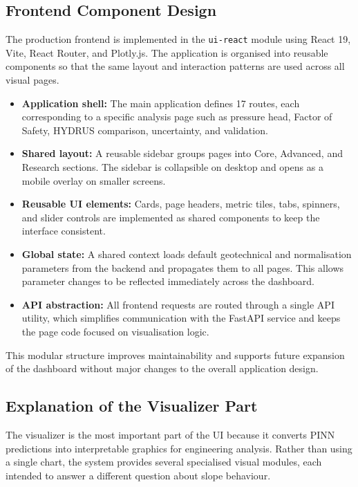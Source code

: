 \documentclass[12pt]{report}
\begin{document}
\subsection{Frontend Component Design}

The production frontend is implemented in the \texttt{ui-react}
module using React 19, Vite, React Router, and Plotly.js. The
application is organised into reusable components so that the same
layout and interaction patterns are used across all visual pages.

\begin{itemize}
    \item \textbf{Application shell:} The main application defines 17
    routes, each corresponding to a specific analysis page such as
    pressure head, Factor of Safety, HYDRUS comparison, uncertainty,
    and validation.

    \item \textbf{Shared layout:} A reusable sidebar groups pages into
    Core, Advanced, and Research sections. The sidebar is collapsible
    on desktop and opens as a mobile overlay on smaller screens.

    \item \textbf{Reusable UI elements:} Cards, page headers, metric
    tiles, tabs, spinners, and slider controls are implemented as
    shared components to keep the interface consistent.

    \item \textbf{Global state:} A shared context loads default
    geotechnical and normalisation parameters from the backend and
    propagates them to all pages. This allows parameter changes to be
    reflected immediately across the dashboard.

    \item \textbf{API abstraction:} All frontend requests are routed
    through a single API utility, which simplifies communication with
    the FastAPI service and keeps the page code focused on
    visualisation logic.
\end{itemize}

This modular structure improves maintainability and supports future
expansion of the dashboard without major changes to the overall
application design.

\subsection{Explanation of the Visualizer Part}

The visualizer is the most important part of the UI because it converts
PINN predictions into interpretable graphics for engineering analysis.
Rather than using a single chart, the system provides several
specialised visual modules, each intended to answer a different
question about slope behaviour.
\end{document}
